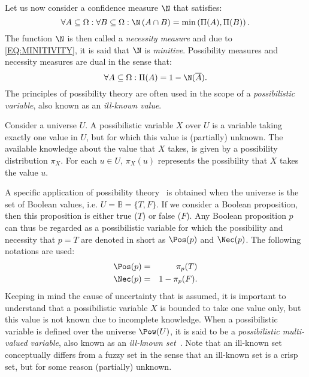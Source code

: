 Let us now consider a confidence measure $\N$ that satisfies:
\begin{equation}
\label{EQ:MINITIVITY}
\forall A\subseteq\Omega:\forall B\subseteq\Omega:\N\left(A\cap B\right) = \min\left(\Pi(A),\Pi(B)\right).
\end{equation}
The function $\N$ is then called a \emph{necessity measure} and due to \eqref{EQ:MINITIVITY}, it is said that $\N$ is \emph{minitive}. Possibility measures and necessity measures are dual in the sense that:
\begin{equation}
\forall A\subseteq\Omega:\Pi(A)=1-\N(\overline{A}).
\end{equation}
The principles of possibility theory are often used in the scope of a \emph{possibilistic variable}, also known as an \emph{ill-known value}.
\begin{definition}
Consider a universe $U$. A possibilistic variable $X$ over $U$ is a variable taking exactly one value in $U$, but for which this value is (partially) unknown. The available knowledge about the value that $X$ takes, is given by a possibility distribution $\pi_X$. For each $u\in U$, $\pi_X(u)$ represents the possibility that $X$ takes the value $u$.
\end{definition}
A specific application of possibility theory~\cite{Prade82,VanSchooten,DeCooman} is obtained when the universe is the set of Boolean values, i.e. $U=\mathbb{B}=\{T,F\}$. If we consider a Boolean proposition, then this proposition is either true ($T$) or false ($F$). Any Boolean proposition $p$ can thus be regarded as a possibilistic variable for which the possibility and necessity that $p=T$ are denoted in short as $\Pos(p)$ and $\Nec(p)$. The following notations are used:
\begin{eqnarray}
\Pos(p)&=&\pi_p(T)\\
\Nec(p)&=&1-\pi_p(F).
\end{eqnarray}
Keeping in mind the cause of uncertainty that is assumed, it is important to understand that a possibilistic variable $X$ is bounded to take one value only, but this value is not known due to incomplete knowledge. When a possibilistic variable is defined over the universe $\Pow(U)$, it is said to be a \emph{possibilistic multi-valued variable}, also known as an \emph{ill-known set}~\cite{Dubois88b}. Note that an ill-known set conceptually differs from a fuzzy set in the sense that an ill-known set is a crisp set, but for some reason (partially) unknown.
